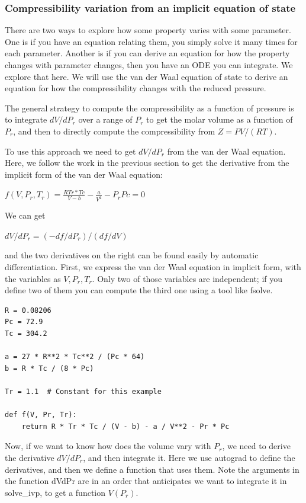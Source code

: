 \documentclass[11pt]{article}
\begin{document}
\subsubsection{Compressibility variation from an implicit equation of state}
\label{sec:orgfc798c3}

There are two ways to explore how some property varies with some parameter. One is if you have an equation relating them, you simply solve it many times for each parameter. Another is if you can derive an equation for how the property changes with parameter changes, then you have an ODE you can integrate. We explore that here. We will use the van der Waal equation of state to derive an equation for how the compressibility changes with the reduced pressure.

The general strategy to compute the compressibility as a function of pressure is to integrate \(dV / dP_r\) over a range of \(P_r\) to get the molar volume as a function of \(P_r\), and then to directly compute the compressibility from \(Z = PV/(RT)\).

To use this approach we need to get \(dV / dP_r\) from the van der Waal equation. Here, we follow the work in the previous section to get the derivative from the implicit form of the van der Waal equation:

\(f(V, P_r, T_r) = \frac{R Tr * Tc}{V - b} - \frac{a}{V^2} - P_r Pc = 0\)

We can get

\(dV/dP_r = (-df/dP_r) / (df/dV)\)

and the two derivatives on the right can be found easily by automatic differentiation. First, we express the van der Waal equation in implicit form, with the variables as \(V, P_r, T_r\). Only two of those variables are independent; if you define two of them you can compute the third one using a tool like fsolve.

\begin{verbatim}
R = 0.08206
Pc = 72.9
Tc = 304.2

a = 27 * R**2 * Tc**2 / (Pc * 64)
b = R * Tc / (8 * Pc)

Tr = 1.1  # Constant for this example

def f(V, Pr, Tr):
    return R * Tr * Tc / (V - b) - a / V**2 - Pr * Pc
\end{verbatim}

Now, if we want to know how does the volume vary with \(P_r\), we need to derive the derivative \(dV/dP_r\), and then integrate it. Here we use autograd to define the derivatives, and then we define a function that uses them. Note the arguments in the function dVdPr are in an order that anticipates we want to integrate it in solve\_ivp, to get a function \(V(P_r)\).
\end{document}
